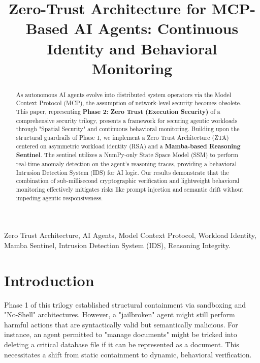 \documentclass[conference]{IEEEtran}
\begin{document}
\title{Zero-Trust Architecture for MCP-Based AI Agents: Continuous Identity and Behavioral Monitoring}

\author{
}

\maketitle

\begin{abstract}
As autonomous AI agents evolve into distributed system operators via the Model Context Protocol (MCP), the assumption of network-level security becomes obsolete. This paper, representing \textbf{Phase 2: Zero Trust (Execution Security)} of a comprehensive security trilogy, presents a framework for securing agentic workloads through "Spatial Security" and continuous behavioral monitoring. Building upon the structural guardrails of Phase 1, we implement a Zero Trust Architecture (ZTA) centered on asymmetric workload identity (RSA) and a \textbf{Mamba-based Reasoning Sentinel}. The sentinel utilizes a NumPy-only State Space Model (SSM) to perform real-time anomaly detection on the agent's reasoning traces, providing a behavioral Intrusion Detection System (IDS) for AI logic. Our results demonstrate that the combination of sub-millisecond cryptographic verification and lightweight behavioral monitoring effectively mitigates risks like prompt injection and semantic drift without impeding agentic responsiveness.
\end{abstract}

\begin{IEEEkeywords}
Zero Trust Architecture, AI Agents, Model Context Protocol, Workload Identity, Mamba Sentinel, Intrusion Detection System (IDS), Reasoning Integrity.
\end{IEEEkeywords}

\section{Introduction}
Phase 1 of this trilogy \cite{ando2026guardrails} established structural containment via sandboxing and "No-Shell" architectures. However, a "jailbroken" agent might still perform harmful actions that are syntactically valid but semantically malicious. For instance, an agent permitted to "manage documents" might be tricked into deleting a critical database file if it can be represented as a document. This necessitates a shift from static containment to dynamic, behavioral verification.
\end{document}
